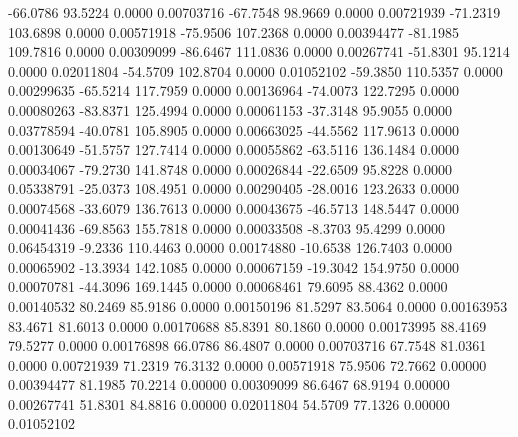     -66.0786      93.5224       0.0000           0.00703716
    -67.7548      98.9669       0.0000           0.00721939
    -71.2319     103.6898       0.0000           0.00571918
    -75.9506     107.2368       0.0000           0.00394477
    -81.1985     109.7816       0.0000           0.00309099
    -86.6467     111.0836       0.0000           0.00267741
    -51.8301      95.1214       0.0000           0.02011804
    -54.5709     102.8704       0.0000           0.01052102
    -59.3850     110.5357       0.0000           0.00299635
    -65.5214     117.7959       0.0000           0.00136964
    -74.0073     122.7295       0.0000           0.00080263
    -83.8371     125.4994       0.0000           0.00061153
    -37.3148      95.9055       0.0000           0.03778594
    -40.0781     105.8905       0.0000           0.00663025
    -44.5562     117.9613       0.0000           0.00130649
    -51.5757     127.7414       0.0000           0.00055862
    -63.5116     136.1484       0.0000           0.00034067
    -79.2730     141.8748       0.0000           0.00026844
    -22.6509      95.8228       0.0000           0.05338791
    -25.0373     108.4951       0.0000           0.00290405
    -28.0016     123.2633       0.0000           0.00074568
    -33.6079     136.7613       0.0000           0.00043675
    -46.5713     148.5447       0.0000           0.00041436
    -69.8563     155.7818       0.0000           0.00033508
     -8.3703      95.4299       0.0000           0.06454319
     -9.2336     110.4463       0.0000           0.00174880
    -10.6538     126.7403       0.0000           0.00065902
    -13.3934     142.1085       0.0000           0.00067159
    -19.3042     154.9750       0.0000           0.00070781
    -44.3096     169.1445       0.0000           0.00068461
     79.6095      88.4362       0.0000           0.00140532
     80.2469      85.9186       0.0000           0.00150196
     81.5297      83.5064       0.0000           0.00163953
     83.4671      81.6013       0.0000           0.00170688
     85.8391      80.1860       0.0000           0.00173995
     88.4169      79.5277       0.0000           0.00176898
     66.0786      86.4807       0.0000           0.00703716
     67.7548      81.0361       0.0000           0.00721939
     71.2319      76.3132       0.0000           0.00571918
     75.9506      72.7662       0.00000           0.00394477
     81.1985      70.2214       0.00000           0.00309099
     86.6467      68.9194       0.00000           0.00267741
     51.8301      84.8816       0.00000           0.02011804
     54.5709      77.1326       0.00000           0.01052102
